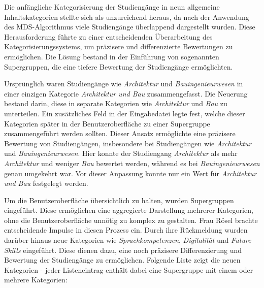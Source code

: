 Die anfängliche Kategorisierung der Studiengänge in neun allgemeine
Inhaltskategorien stellte sich als unzureichend heraus, da nach der Anwendung
des MDS-Algorithmus viele Studiengänge überlappend dargestellt wurden. Diese
Herausforderung führte zu einer entscheidenden Überarbeitung des
Kategorisierungssystems, um präzisere und differenzierte Bewertungen zu
ermöglichen. Die Lösung bestand in der Einführung von sogenannten Supergruppen,
die eine tiefere Bewertung der Studiengänge ermöglichten.

Ursprünglich waren Studiengänge wie \textit{Architektur} und
\textit{Bauingenieurwesen} in einer einzigen Kategorie
\textit{Architektur und Bau} zusammengefasst. Die Neuerung bestand darin, diese
in separate Kategorien wie \textit{Architektur} und \textit{Bau} zu unterteilen.
Ein zusätzliches Feld in der Eingabedatei legte fest, welche dieser Kategorien
später in der Benutzeroberfläche zu einer Supergruppe zusammengeführt werden
sollten. Dieser Ansatz ermöglichte eine präzisere Bewertung von Studiengängen,
insbesondere bei Studiengängen wie \textit{Architektur} und
\textit{Bauingenieurwesen}. Hier konnte der Studiengang \textit{Architektur} als
mehr \textit{Architektur} und weniger \textit{Bau} bewertet werden, während es
bei \textit{Bauingenieurwesen} genau umgekehrt war. Vor dieser Anpassung konnte
nur ein Wert für \textit{Architektur und Bau} festgelegt werden.

Um die Benutzeroberfläche übersichtlich zu halten, wurden Supergruppen
eingeführt. Diese ermöglichen eine aggregierte Darstellung mehrerer Kategorien,
ohne die Benutzeroberfläche unnötig zu komplex zu gestalten. Frau Rösel brachte
entscheidende Impulse in diesen Prozess ein. Durch ihre Rückmeldung wurden
darüber hinaus neue Kategorien wie \textit{Sprachkompetenzen},
\textit{Digitalität} und \textit{Future Skills} eingeführt. Diese dienen dazu,
eine noch präzisere Differenzierung und Bewertung der Studiengänge zu
ermöglichen. Folgende Liste zeigt die neuen Kategorien - jeder Listeneintrag
enthält dabei eine Supergruppe mit einem oder mehrere Kategorien:

